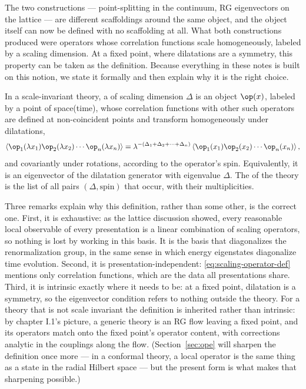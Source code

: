 The two constructions --- point-splitting in the continuum, RG eigenvectors
on the lattice --- are different scaffoldings around the same object, and the
object itself can now be defined with no scaffolding at all. What both
constructions produced were operators whose correlation functions scale
homogeneously, labeled by a scaling dimension. At a fixed point, where
dilatations are a symmetry, this property can be taken as the definition.
Because everything in these notes is built on this notion, we state it
formally and then explain why it is the right choice.

\begin{ddefinition}
\label{def:local-operator}
In a scale-invariant theory, a  of scaling dimension
$\Delta$ is an object $\op(x)$, labeled by a point of space(time), whose
correlation functions with other such operators are defined at non-coincident
points and transform homogeneously under dilatations,
\begin{equation}
\left\langle \op_1(\lambda x_1) \op_2(\lambda x_2) \cdots
\op_n(\lambda x_n)\right\rangle
= \lambda^{-(\Delta_1 + \Delta_2 + \cdots + \Delta_n)}
\left\langle \op_1(x_1) \op_2(x_2)\cdots \op_n(x_n)\right\rangle ,
\label{eq:scaling-operator-def}
\end{equation}
and covariantly under rotations, according to the operator's spin.
Equivalently, it is an eigenvector of the dilatation generator with
eigenvalue $\Delta$. The  of the theory is the list
of all pairs $(\Delta, \text{spin})$ that occur, with their multiplicities.
\end{ddefinition}

\noin Three remarks explain why this definition, rather than some other, is
the correct one. First, it is exhaustive: as the lattice discussion showed,
every reasonable local observable of every presentation is a linear
combination of scaling operators, so nothing is lost by working in this
basis. It is the basis that diagonalizes the renormalization group, in the
same sense in which energy eigenstates diagonalize time evolution. Second,
it is presentation-independent: \eqref{eq:scaling-operator-def} mentions only
correlation functions, which are the data all presentations share. Third, it
is intrinsic exactly where it needs to be: at a fixed point, dilatation is a
symmetry, so the eigenvector condition refers to nothing outside the theory.
For a theory that is not scale invariant the definition is inherited rather
than intrinsic: by chapter I.1's picture, a generic theory is an RG flow
leaving a fixed point, and its operators match onto the fixed point's
operator content, with corrections analytic in the couplings along the flow.
(Section~\ref{sec:ope} will sharpen the definition once more --- in a
conformal theory, a local operator is the same thing as a state in the radial
Hilbert space --- but the present form is what makes that sharpening
possible.)


